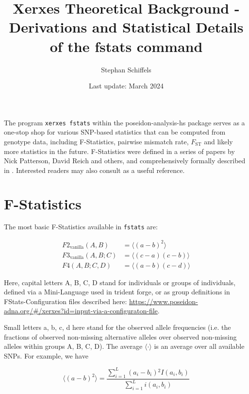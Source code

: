 \documentclass{article}
\begin{document}
\title{Xerxes Theoretical Background - Derivations and Statistical Details of the fstats command}
\author{Stephan Schiffels}
\date{Last update: March 2024}
\maketitle

\tableofcontents
\vspace{10mm}

The program \texttt{xerxes fstats} within the poseidon-analysis-hs package serves as a one-stop shop for various SNP-based statistics that can be computed from genotype data, including F-Statistics, pairwise mismatch rate, $F_\text{ST}$ and likely more statistics in the future. F-Statistics were defined in a series of papers by Nick Patterson, David Reich and others, and comprehensively formally described in \cite{Patterson2012-yq}. Interested readers may also consult \cite{Peter2016-ml} as a useful reference.

\section{F-Statistics}

The most basic F-Statistics available in \texttt{fstats} are:

\begin{align}
F2_\text{vanilla}(A, B) &= \langle(a-b)^2\rangle\\
F3_\text{vanilla}(A, B; C) &= \langle (c-a)(c-b) \rangle\\
F4(A, B; C, D) &= \langle (a-b)(c-d) \rangle
\end{align}

Here, capital letters A, B, C, D stand for individuals or groups of individuals, defined via a Mini-Language used in trident forge, or as group definitions in FStats-Configuration files described here: \url{https://www.poseidon-adna.org/#/xerxes?id=input-via-a-configuraton-file}.

Small letters a, b, c, d here stand for the observed allele frequencies (i.e. the fractions of observed non-missing alternative alleles over observed non-missing alleles within groups A, B, C, D). The average \(\langle \cdot\rangle\) is an average over all available SNPs. For example, we have

\begin{equation}
\langle(a-b)^2\rangle=\frac{\sum _{i=1}^L \left(a_i-b_i\right){}^2 I\left(a_i,b_i\right)}{\sum _{i=1}^L i\left(a_i,b_i\right)}
\end{equation}
\end{document}
